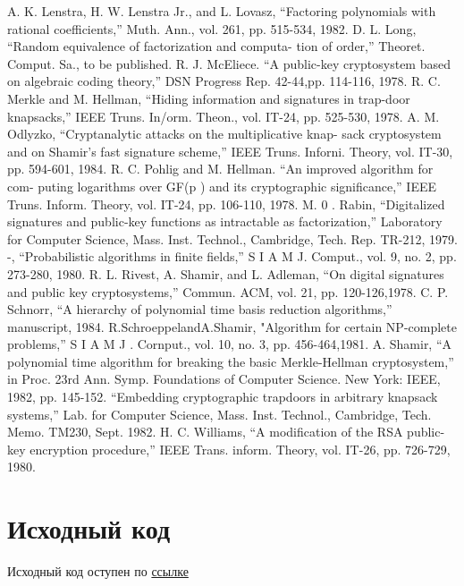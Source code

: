 \documentclass[a4paper,12pt]{article}
\begin{document}
\begin{thebibliography}{9}
A. K. Lenstra, H. W. Lenstra Jr., and L. Lovasz, “Factoring polynomials with rational coefficients,” Muth. Ann., vol. 261, pp. 515-534, 1982.
D. L. Long, “Random equivalence of factorization and computa- tion of order,” Theoret. Comput. Sa., to be published.
R. J. McEliece. “A public-key cryptosystem based on algebraic coding theory,” DSN Progress Rep. 42-44,pp. 114-116, 1978.
R. C. Merkle and M. Hellman, “Hiding information and signatures in trap-door knapsacks,” IEEE Truns. In/orm. Theon., vol. IT-24, pp. 525-530, 1978.
A. M. Odlyzko, “Cryptanalytic attacks on the multiplicative knap- sack cryptosystem and on Shamir’s fast signature scheme,” IEEE Truns. Inforni. Theory, vol. IT-30, pp. 594-601, 1984.
R. C. Pohlig and M. Hellman. “An improved algorithm for com- puting logarithms over GF(p ) and its cryptographic significance,” IEEE Truns. Inform. Theory, vol. IT-24, pp. 106-110, 1978.
M. 0 . Rabin, “Digitalized signatures and public-key functions as intractable as factorization,” Laboratory for Computer Science, Mass. Inst. Technol., Cambridge, Tech. Rep. TR-212, 1979.
-, “Probabilistic algorithms in finite fields,” S I A M J. Comput., vol. 9, no. 2, pp. 273-280, 1980.
R. L. Rivest, A. Shamir, and L. Adleman, “On digital signatures and public key cryptosystems,” Commun. ACM, vol. 21, pp. 120-126,1978.
C. P. Schnorr, “A hierarchy of polynomial time basis reduction algorithms,” manuscript, 1984.
R.SchroeppelandA.Shamir, "Algorithm for certain NP-complete problems,” S I A M J . Cornput., vol.
10, no. 3, pp. 456-464,1981.
A. Shamir, “A polynomial time algorithm for breaking the basic
Merkle-Hellman cryptosystem,” in Proc. 23rd Ann. Symp. Foundations of Computer Science. New York: IEEE, 1982, pp. 145-152.
“Embedding cryptographic trapdoors in arbitrary knapsack systems,” Lab. for Computer Science, Mass. Inst. Technol., Cambridge, Tech. Memo. TM230, Sept. 1982.
H. C. Williams, “A modification of the RSA public-key encryption procedure,” IEEE Trans. inform. Theory, vol. IT-26, pp. 726-729, 1980.
\end{thebibliography}

\newpage

\section{Исходный код}

Исходный код оступен по \href{https://github.com/ShamrinIgor/Knapsack-Cryptosystem}{ссылке}
\end{document}
